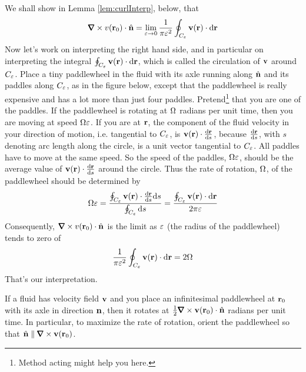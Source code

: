 We shall show in Lemma \ref{lem:curlInterp}, below, that
\begin{equation*}%
\vnabla\times v(\vr_0)\cdot \hn
=\lim_{\veps\rightarrow 0}\frac{1}{\pi\veps^2}
         \oint_{C_\veps} \vv(\vr)\cdot \dee{\vr}
\end{equation*}
Now let's work on interpreting the right hand side, and in particular
on interpreting the integral $\oint_{C_\varepsilon} \mathbf{v}(\mathbf{r})\cdot \mathrm{d}\mathbf{r}$,
which is called the circulation of $\mathbf{v}$ around $C_\varepsilon$.
Place a tiny paddlewheel in the fluid with its axle running along $\hat{\mathbf{n}}$
and its paddles along $C_\varepsilon$, as in the figure below, except that
the paddlewheel is really expensive and has a lot more than just four
paddles. Pretend\footnote{Method acting might help you here.} that you are one of the paddles. If the paddlewheel
is rotating at $\Omega$ radians per unit time, then you are moving
at speed $\Omega \varepsilon$. If you are at $\mathbf{r}$, the component of the fluid velocity in your direction of motion, i.e. tangential to $C_\varepsilon$, is $\vv(\vr)\cdot\diff{\vr}{s}$,
because $\diff{\vr}{s}$, with $s$ denoting arc length along the circle, 
is a unit vector tangential to 
$C_\varepsilon$. All paddles have to move at the same speed. So the speed of the 
paddles, $\Omega\varepsilon$, should be the average value of $\vv(\vr)\cdot\diff{\vr}{s}$ around the circle.
Thus the rate of rotation, $\Omega$, of the  paddlewheel should be
determined by
\begin{align*}
\Om \veps 
&= \frac{\oint_{C_\veps} \vv(\vr)\cdot\diff{\vr}{s}\dee{s}}
              {\oint_{C_\veps}\dee{s}} 
= \frac{\oint_{C_\veps} \vv(\vr)\cdot\dee{\vr}}
              {2\pi\veps} \\
\end{align*}
Consequently, $\vnabla\times v(\vr_0)\cdot \hn$ is the limit
as $\varepsilon$ (the radius of the paddlewheel) tends to zero of
\begin{align*}
\frac{1}{\pi\varepsilon^2}
         \oint_{C_\varepsilon} \mathbf{v}(\mathbf{r})\cdot \mathrm{d}\mathbf{r}
=2\Omega
\end{align*}
That's our interpretation.
\begin{impeqn}\label{eq:curlInterp}
If a fluid has velocity field $\mathbf{v}$ and you place an infinitesimal
paddlewheel at $\mathbf{r}_0$ with its axle in direction $\mathbf{n}$, then it rotates
at $\frac{1}{2}\vnabla\times \vv(\vr_0)\cdot \hn$ radians per unit time.
In particular, to maximize the rate of rotation, orient the paddlewheel so that
$\hn\parallel\vnabla\times \vv(\vr_0)$.
\end{impeqn}

